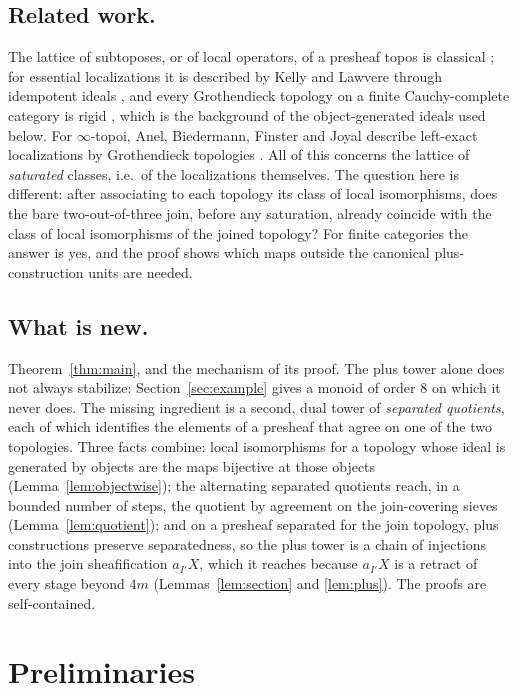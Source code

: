\documentclass[11pt]{amsart}
\theoremstyle{definition}
\begin{document}
\subsection*{Related work.}
The lattice of subtoposes, or of local operators, of a presheaf topos is
classical \cite{MLM,Elephant}; for essential localizations it is described by
Kelly and Lawvere through idempotent ideals \cite{KL89}, and every
Grothendieck topology on a finite Cauchy-complete category is rigid
\cite{Marques25}, which is the background of the object-generated ideals used
below. For $\infty$-topoi, Anel, Biedermann, Finster and Joyal describe
left-exact localizations by Grothendieck topologies \cite{ABFJ2}. All of this
concerns the lattice of \emph{saturated} classes, i.e.\ of the localizations
themselves. The question here is different: after associating to each topology
its class of local isomorphisms, does the bare two-out-of-three join, before any
saturation, already coincide with the class of local isomorphisms of the joined
topology? For finite categories the answer is yes, and the proof shows which
maps outside the canonical plus-construction units are needed.

\subsection*{What is new.}
Theorem~\ref{thm:main}, and the mechanism of its proof. The plus tower alone
does not always stabilize: Section~\ref{sec:example} gives a monoid of order
$8$ on which it never does. The missing ingredient is a second, dual tower of
\emph{separated quotients}, each of which identifies the elements of a
presheaf that agree on one of the two topologies. Three facts combine:
local isomorphisms for a topology whose ideal is generated by objects are the
maps bijective at those objects (Lemma~\ref{lem:objectwise}); the alternating
separated quotients reach, in a bounded number of steps, the quotient by
agreement on the join-covering sieves (Lemma~\ref{lem:quotient}); and on a
presheaf separated for the join topology, plus constructions preserve
separatedness, so the plus tower is a chain of injections into the join
sheafification $a_{I'}X$, which it reaches because $a_{I'}X$ is a retract of
every stage beyond $4m$ (Lemmas~\ref{lem:section} and \ref{lem:plus}). The proofs are self-contained.

\section{Preliminaries}\label{sec:prelim}
\end{document}
